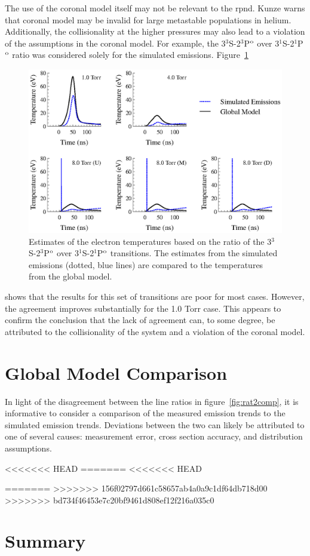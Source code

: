 The use of the coronal model itself may not be relevant to the \acs{rpnd}. Kunze
\cite{Kunze2009} warns that coronal model may be invalid for large metastable
populations in helium. Additionally, the collisionality at the higher pressures
may also lead to a violation of the assumptions in the coronal model. For
example, the 3$^3$S-2$^3$P$^\mathrm{o}$ over 3$^1$S-2$^1$P$^\mathrm{o}$ ratio was considered
solely for the simulated emissions. Figure~\ref{fig:rat1comp}
\begin{figure}
  \centering
  \includegraphics{./chapters/emissions/figures/rat1comp.eps}
  \caption{Estimates of the electron temperatures based on the ratio of the
    3$^3$S-2$^3$P$^\mathrm{o}$ over 3$^1$S-2$^1$P$^\mathrm{o}$ transitions. The estimates from
    the simulated emissions (dotted, blue lines) are compared to the temperatures
    from the global model.}
  \label{fig:rat1comp}
\end{figure}
shows that the results for this set of transitions are poor for most cases.
However, the agreement improves substantially for the 1.0 Torr case. This
appears to confirm the conclusion that the lack of agreement can, to some
degree, be attributed to the collisionality of the system and a violation of the
coronal model.

\section{Global Model Comparison}

In light of the disagreement between the line ratios in
figure~\ref{fig:rat2comp}, it is informative to consider a comparison of the
measured emission trends to the simulated emission trends. Deviations between
the two can likely be attributed to one of several causes: measurement error,
cross section accuracy, and distribution assumptions.

<<<<<<< HEAD
=======
<<<<<<< HEAD

=======
>>>>>>> 156f02797d661c58657ab4a0a9c1df64db718d00
>>>>>>> bd734f46453e7c20bf9461d808ef12f216a035c0
\section{Summary}
